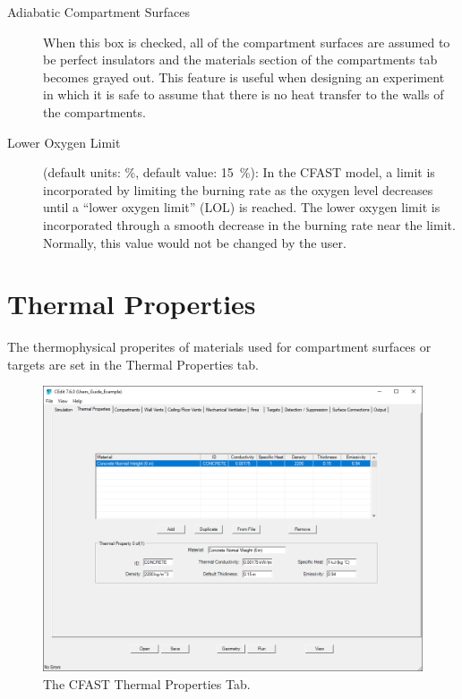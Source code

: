 \begin{description}
\item[Adiabatic Compartment Surfaces] When this box is checked, all of the compartment surfaces are assumed to be perfect insulators and the materials section of the compartments tab becomes grayed out. This feature is useful when designing an experiment in which it is safe to assume that there is no heat transfer to the walls of the compartments.

\item[Lower Oxygen Limit] (default units: \%, default value: 15~\%):  In the CFAST model, a limit is incorporated by limiting the burning rate as the oxygen level decreases until a ``lower oxygen limit'' (LOL) is reached. The lower oxygen limit is incorporated through a smooth decrease in the burning rate near the limit. Normally, this value would not be changed by the user.
\end{description}





\chapter{Thermal Properties}

The thermophysical properites of materials used for compartment surfaces or targets are set in the Thermal Properties tab.

\begin{figure}[ht]
\centering
\includegraphics[width=6.5in]{FIGURES/Thermal_Properties_Tab}
\caption[The CFAST Thermal Properties Tab]{The CFAST Thermal Properties Tab.}
\end{figure}

